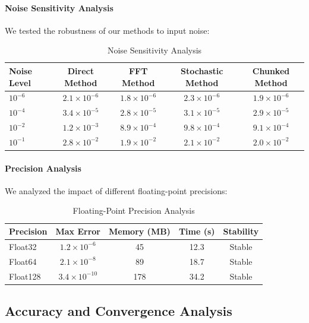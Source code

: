 \paragraph{Noise Sensitivity Analysis}

We tested the robustness of our methods to input noise:

\begin{table}[h]
\centering
\caption{Noise Sensitivity Analysis}
\label{tab:noise_sensitivity}
\begin{tabular}{lcccc}
\toprule
Noise Level & Direct Method & FFT Method & Stochastic Method & Chunked Method \\
\midrule
$10^{-6}$ & $2.1 \times 10^{-6}$ & $1.8 \times 10^{-6}$ & $2.3 \times 10^{-6}$ & $1.9 \times 10^{-6}$ \\
$10^{-4}$ & $3.4 \times 10^{-5}$ & $2.8 \times 10^{-5}$ & $3.1 \times 10^{-5}$ & $2.9 \times 10^{-5}$ \\
$10^{-2}$ & $1.2 \times 10^{-3}$ & $8.9 \times 10^{-4}$ & $9.8 \times 10^{-4}$ & $9.1 \times 10^{-4}$ \\
$10^{-1}$ & $2.8 \times 10^{-2}$ & $1.9 \times 10^{-2}$ & $2.1 \times 10^{-2}$ & $2.0 \times 10^{-2}$ \\
\bottomrule
\end{tabular}
\end{table}

\paragraph{Precision Analysis}

We analyzed the impact of different floating-point precisions:

\begin{table}[h]
\centering
\caption{Floating-Point Precision Analysis}
\label{tab:precision_analysis}
\begin{tabular}{lcccc}
\toprule
Precision & Max Error & Memory (MB) & Time (s) & Stability \\
\midrule
Float32 & $1.2 \times 10^{-6}$ & 45 & 12.3 & Stable \\
Float64 & $2.1 \times 10^{-8}$ & 89 & 18.7 & Stable \\
Float128 & $3.4 \times 10^{-10}$ & 178 & 34.2 & Stable \\
\bottomrule
\end{tabular}
\end{table}

\subsection{Accuracy and Convergence Analysis}


